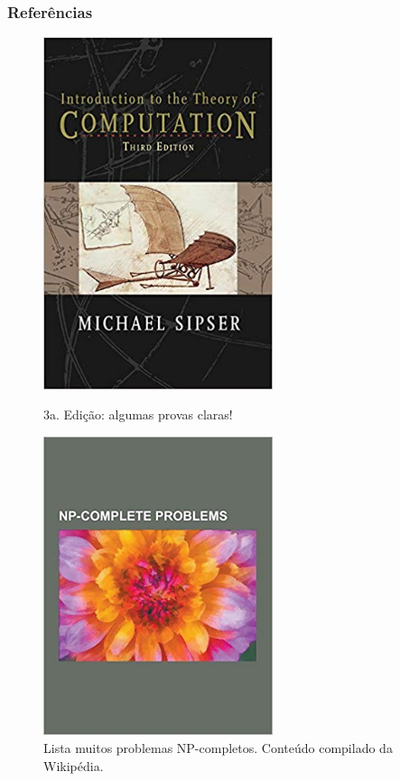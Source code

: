 \documentclass[10pt]{beamer}
\begin{document}
\begin{frame}[fragile]
\frametitle{Referências}


\begin{figure}[!ht]
	
	\begin{minipage}[b]{0.475\linewidth}
		\centering
			\includegraphics[width=0.6\textwidth, height =.6\textheight]{figuras/livro_sipser.jpg}
		\caption{3a. Edição: algumas provas claras!}
	\end{minipage}
	\hspace{0.2cm}
	\begin{minipage}[b]{0.475\linewidth}
		\centering
		\includegraphics[width=0.6\textwidth, height =.6\textheight]{livro_NP_complete.jpg}
		\caption{Lista muitos problemas NP-completos. Conteúdo compilado da Wikipédia.}
	\end{minipage}

\end{figure}



\end{frame}
\end{document}
